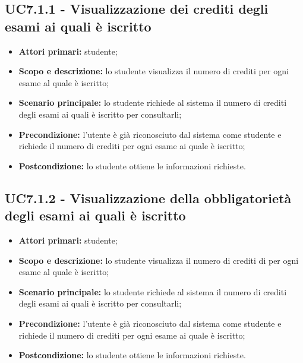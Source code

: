 \documentclass[AnalisiDeiRequisiti.tex]{subfiles}
\begin{document}
\subsection{UC7.1.1 - Visualizzazione dei crediti degli esami ai quali è iscritto}
\begin{itemize}
\item \textbf{Attori primari:} studente;\\
\item \textbf{Scopo e descrizione:} lo studente visualizza il numero di crediti per ogni esame al quale è iscritto;\\
\item \textbf{Scenario principale:} lo studente richiede al sistema il numero di crediti degli esami ai quali è iscritto per consultarli;\\
\item \textbf{Precondizione:} l'utente è già riconosciuto dal sistema come studente e richiede il numero di crediti per ogni esame ai quale è iscritto;\\
\item \textbf{Postcondizione:} lo studente ottiene le informazioni richieste.\\
\end{itemize}

\subsection{UC7.1.2 - Visualizzazione della obbligatorietà degli esami ai quali è iscritto}
\begin{itemize}
	\item \textbf{Attori primari:} studente;\\
	\item \textbf{Scopo e descrizione:} lo studente visualizza il numero di crediti di per ogni esame al quale è iscritto;\\
	\item \textbf{Scenario principale:} lo studente richiede al sistema il numero di crediti degli esami ai quali è iscritto per consultarli;\\
	\item \textbf{Precondizione:} l'utente è già riconosciuto dal sistema come studente e richiede il numero di crediti per ogni esame ai quale è iscritto;\\
	\item \textbf{Postcondizione:} lo studente ottiene le informazioni richieste.\\
\end{itemize}
\end{document}
